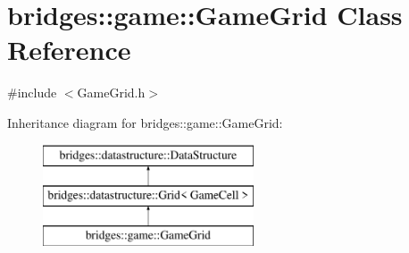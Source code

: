 \hypertarget{classbridges_1_1game_1_1_game_grid}{}\section{bridges\+::game\+::Game\+Grid Class Reference}
\label{classbridges_1_1game_1_1_game_grid}


{\ttfamily \#include $<$Game\+Grid.\+h$>$}

Inheritance diagram for bridges\+::game\+::Game\+Grid\+:\begin{figure}[H]
\begin{center}
\leavevmode
\includegraphics[height=3.000000cm]{classbridges_1_1game_1_1_game_grid}
\end{center}
\end{figure}
